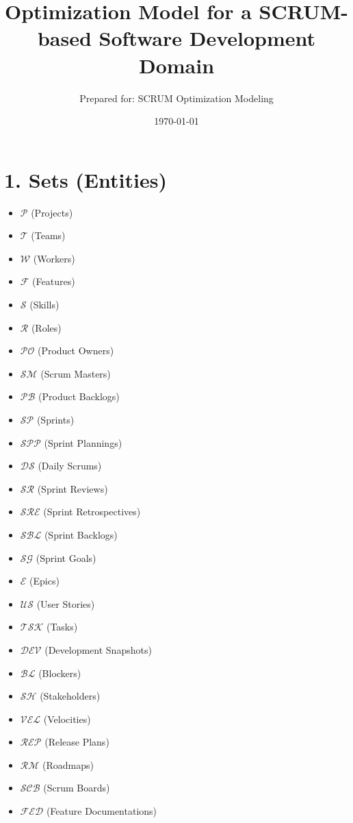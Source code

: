 \documentclass[a4paper,11pt]{article}
\title{Optimization Model for a SCRUM-based Software Development Domain}
\author{Prepared for: SCRUM Optimization Modeling}
\date{\today}
\begin{document}
\maketitle
\tableofcontents
\newpage

\section{1. Sets (Entities)}
\begin{itemize}[leftmargin=2em]
  \item $\mathcal{P}$ (Projects) \; [Index: $p$]
  \item $\mathcal{T}$ (Teams) \; [Index: $t$]
  \item $\mathcal{W}$ (Workers) \; [Index: $w$]
  \item $\mathcal{F}$ (Features) \; [Index: $f$]
  \item $\mathcal{S}$ (Skills) \; [Index: $s$]
  \item $\mathcal{R}$ (Roles) \; [Index: $r$]
  \item $\mathcal{PO}$ (Product Owners) \; [Index: $po$]
  \item $\mathcal{SM}$ (Scrum Masters) \; [Index: $sm$]
  \item $\mathcal{PB}$ (Product Backlogs) \; [Index: $pb$]
  \item $\mathcal{SP}$ (Sprints) \; [Index: $sp$]
  \item $\mathcal{SPP}$ (Sprint Plannings) 
  \item $\mathcal{DS}$ (Daily Scrums) \; [Index: $ds$]
  \item $\mathcal{SR}$ (Sprint Reviews) \; [Index: $sr$]
  \item $\mathcal{SRE}$ (Sprint Retrospectives) 
  \item $\mathcal{SBL}$ (Sprint Backlogs) 
  \item $\mathcal{SG}$ (Sprint Goals) \; [Index: $sg$]
  \item $\mathcal{E}$ (Epics) \; [Index: $e$]
  \item $\mathcal{US}$ (User Stories) \; [Index: $u$]
  \item $\mathcal{TSK}$ (Tasks) 
  \item $\mathcal{DEV}$ (Development Snapshots) \; [Index: $d$]
  \item $\mathcal{BL}$ (Blockers) \; [Index: $b$]
  \item $\mathcal{SH}$ (Stakeholders) \; [Index: $h$]
  \item $\mathcal{VEL}$ (Velocities) \; [Index: $v$]
  \item $\mathcal{REP}$ (Release Plans) 
  \item $\mathcal{RM}$ (Roadmaps) \; [Index: $rm$]
  \item $\mathcal{SCB}$ (Scrum Boards) 
  \item $\mathcal{FED}$ (Feature Documentations) \; [Index: $fd$]
\end{itemize}
\end{document}
